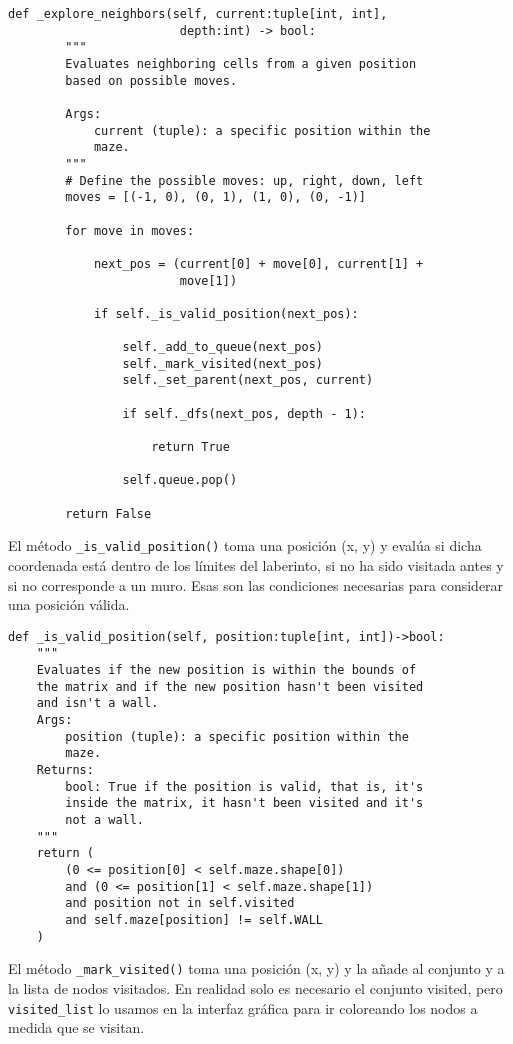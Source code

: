 \begin{lstlisting}
def _explore_neighbors(self, current:tuple[int, int], 
                        depth:int) -> bool:
        """
        Evaluates neighboring cells from a given position
        based on possible moves.

        Args:
            current (tuple): a specific position within the
            maze.
        """
        # Define the possible moves: up, right, down, left
        moves = [(-1, 0), (0, 1), (1, 0), (0, -1)]

        for move in moves:
        
            next_pos = (current[0] + move[0], current[1] + 
                        move[1])
                        
            if self._is_valid_position(next_pos):
            
                self._add_to_queue(next_pos)
                self._mark_visited(next_pos)
                self._set_parent(next_pos, current)
                
                if self._dfs(next_pos, depth - 1):
                
                    return True
                    
                self.queue.pop()
                
        return False
\end{lstlisting}
\clearpage
El método \lstinline{_is_valid_position()} toma una posición (x, y) y evalúa si dicha coordenada está dentro de los límites del laberinto, si no ha sido visitada antes y si no corresponde a un muro. Esas son las condiciones necesarias para considerar una posición válida.\\
\begin{lstlisting}
def _is_valid_position(self, position:tuple[int, int])->bool:
    """
    Evaluates if the new position is within the bounds of
    the matrix and if the new position hasn't been visited
    and isn't a wall.
    Args:
        position (tuple): a specific position within the
        maze.
    Returns:
        bool: True if the position is valid, that is, it's
        inside the matrix, it hasn't been visited and it's
        not a wall.
    """
    return (
        (0 <= position[0] < self.maze.shape[0])
        and (0 <= position[1] < self.maze.shape[1])
        and position not in self.visited
        and self.maze[position] != self.WALL
    )
\end{lstlisting}
El método \lstinline{_mark_visited()} toma una posición (x, y) y la añade al conjunto y a la lista de nodos visitados. En realidad solo es necesario el conjunto visited, pero \lstinline{visited_list} lo usamos en la interfaz gráfica para ir coloreando los nodos a medida que se visitan.\\
